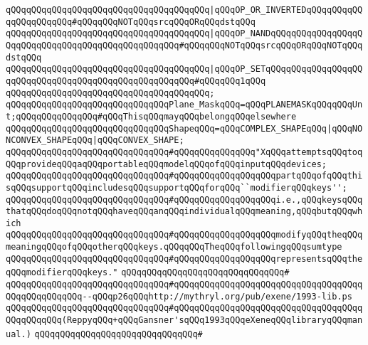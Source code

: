 \verb|qQQqqQQqqQQqqQQqqQQqqQQqqQQqqQQqqQQqqQQq|\verb#|qQQqOP_OR_INVERTEDqQQqqQQqqQQqqQQqqQQqqQQq#\verb|#qQQqqQQqNOTqQQqsrcqQQqORqQQqdstqQQq|\newline
\verb|qQQqqQQqqQQqqQQqqQQqqQQqqQQqqQQqqQQqqQQq|\verb#|qQQqOP_NANDqQQqqQQqqQQqqQQqqQQqqQQqqQQqqQQqqQQqqQQqqQQqqQQqqQQq#\verb|#qQQqqQQqNOTqQQqsrcqQQqORqQQqNOTqQQqdstqQQq|\newline
\verb|qQQqqQQqqQQqqQQqqQQqqQQqqQQqqQQqqQQqqQQq|\verb#|qQQqOP_SETqQQqqQQqqQQqqQQqqQQqqQQqqQQqqQQqqQQqqQQqqQQqqQQqqQQqqQQq#\verb|#qQQqqQQq1qQQq|\newline
\verb|qQQqqQQqqQQqqQQqqQQqqQQqqQQqqQQqqQQqqQQq;|\newline
\newline
\verb|qQQqqQQqqQQqqQQqqQQqqQQqqQQqqQQqPlane_MaskqQQq=qQQqPLANEMASKqQQqqQQqUnt;qQQqqQQqqQQqqQQq#qQQqThisqQQqmayqQQqbelongqQQqelsewhere|\newline
\newline
\verb|qQQqqQQqqQQqqQQqqQQqqQQqqQQqqQQqShapeqQQq=qQQqCOMPLEX_SHAPEqQQq|\verb#|qQQqNONCONVEX_SHAPEqQQq|qQQqCONVEX_SHAPE;#\newline
\newline
\verb|qQQqqQQqqQQqqQQqqQQqqQQqqQQqqQQq#qQQqqQQqqQQqqQQq"XqQQqattemptsqQQqtoqQQqprovideqQQqaqQQqportableqQQqmodelqQQqofqQQqinputqQQqdevices;|\newline
\verb|qQQqqQQqqQQqqQQqqQQqqQQqqQQqqQQq#qQQqqQQqqQQqqQQqqQQqpartqQQqofqQQqthisqQQqsupportqQQqincludesqQQqsupportqQQqforqQQq``modifierqQQqkeys'';|\newline
\verb|qQQqqQQqqQQqqQQqqQQqqQQqqQQqqQQq#qQQqqQQqqQQqqQQqqQQqi.e.,qQQqkeysqQQqthatqQQqdoqQQqnotqQQqhaveqQQqanqQQqindividualqQQqmeaning,qQQqbutqQQqwhich|\newline
\verb|qQQqqQQqqQQqqQQqqQQqqQQqqQQqqQQq#qQQqqQQqqQQqqQQqqQQqmodifyqQQqtheqQQqmeaningqQQqofqQQqotherqQQqkeys.qQQqqQQqTheqQQqfollowingqQQqsumtype|\newline
\verb|qQQqqQQqqQQqqQQqqQQqqQQqqQQqqQQq#qQQqqQQqqQQqqQQqqQQqrepresentsqQQqtheqQQqmodifierqQQqkeys."|\newline
\verb|qQQqqQQqqQQqqQQqqQQqqQQqqQQqqQQq#|\newline
\verb|qQQqqQQqqQQqqQQqqQQqqQQqqQQqqQQq#qQQqqQQqqQQqqQQqqQQqqQQqqQQqqQQqqQQqqQQqqQQqqQQqqQQq--qQQqp26qQQqhttp://mythryl.org/pub/exene/1993-lib.ps|\newline
\verb|qQQqqQQqqQQqqQQqqQQqqQQqqQQqqQQq#qQQqqQQqqQQqqQQqqQQqqQQqqQQqqQQqqQQqqQQqqQQqqQQq(ReppyqQQq+qQQqGansner'sqQQq1993qQQqeXeneqQQqlibraryqQQqmanual.)|\newline
\verb|qQQqqQQqqQQqqQQqqQQqqQQqqQQqqQQq#|\newline
